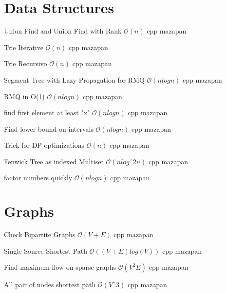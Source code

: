 \section{Data Structures}

{Union Find and Union Find with Rank}
{$\mathcal{O}(n)$}
{cpp}{}
{mazapan}

{Trie Iterative}
{$\mathcal{O}(n)$}
{cpp}{}
{mazapan}

{Trie Recursivo}
{$\mathcal{O}(n)$}
{cpp}{}
{mazapan}

{Segment Tree with Lazy Propagation for RMQ}
{$\mathcal{O}(nlogn)$}
{cpp}{}
{mazapan}

{RMQ in O(1)}
{$\mathcal{O}(nlogn)$}
{cpp}{}
{mazapan}

{find first element at least "x"}
{$\mathcal{O}(nlogn)$}
{cpp}{}
{mazapan}

{Find lower bound on intervals}
{$\mathcal{O}(nlogn)$}
{cpp}{}
{mazapan}

{Trick for DP optimizations}
{$\mathcal{O}(n)$}
{cpp}{}
{mazapan}

{Fenwick Tree as indexed Multiset}
{$\mathcal{O}(nlogˆ2n)$}
{cpp}{}
{mazapan}

{factor numbers quickly}
{$\mathcal{O}(nlogn)$}
{cpp}{}
{mazapan}

\section{Graphs}

{Check Bipartite Graphs}
{$\mathcal{O}(V + E)$}
{cpp}{}
{mazapan}

{Single Source Shortest Path}
{$\mathcal{O}((V + E)log(V))$}
{cpp}{}
{mazapan}

{Find maximum flow on sparse graphs}
{$\mathcal{O}(V^2E)$}
{cpp}{}
{mazapan}


{All pair of nodes shortest path}
{$\mathcal{O}(Vˆ3)$}
{cpp}{}
{mazapan}

